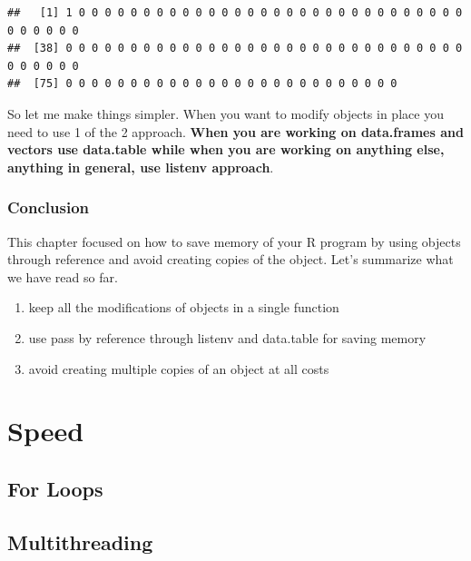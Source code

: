 \documentclass[
]{book}
\newenvironment{Shaded}{\begin{snugshade}}{\end{snugshade}}
\newcommand{\NormalTok}[1]{#1}
\newcommand{\SpecialCharTok}[1]{\textcolor[rgb]{0.00,0.00,0.00}{#1}}
\providecommand{\tightlist}{%
  \setlength{\itemsep}{0pt}\setlength{\parskip}{0pt}}
\begin{document}
\begin{Shaded}
\end{Shaded}

\begin{verbatim}
##   [1] 1 0 0 0 0 0 0 0 0 0 0 0 0 0 0 0 0 0 0 0 0 0 0 0 0 0 0 0 0 0 0 0 0 0 0 0 0
##  [38] 0 0 0 0 0 0 0 0 0 0 0 0 0 0 0 0 0 0 0 0 0 0 0 0 0 0 0 0 0 0 0 0 0 0 0 0 0
##  [75] 0 0 0 0 0 0 0 0 0 0 0 0 0 0 0 0 0 0 0 0 0 0 0 0 0 0
\end{verbatim}

So let me make things simpler. When you want to modify objects in place you need to use 1 of the 2 approach. \textbf{When you are working on data.frames and vectors use data.table while when you are working on anything else, anything in general, use listenv approach}.

\hypertarget{conclusion-5}{%
\section{Conclusion}\label{conclusion-5}}

This chapter focused on how to save memory of your R program by using objects through reference and avoid creating copies of the object. Let's summarize what we have read so far.

\begin{enumerate}
\def\labelenumi{\arabic{enumi}.}
\tightlist
\item
  keep all the modifications of objects in a single function
\item
  use pass by reference through listenv and data.table for saving memory
\item
  avoid creating multiple copies of an object at all costs
\end{enumerate}

\hypertarget{part-speed}{%
\part{Speed}\label{part-speed}}

\hypertarget{loops}{%
\chapter{For Loops}\label{loops}}

\hypertarget{multithreading}{%
\chapter{Multithreading}\label{multithreading}}
\end{document}
